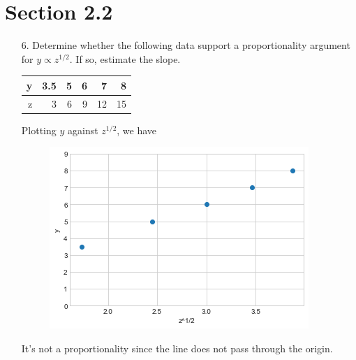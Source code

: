 \documentclass[10pt]{report}
\begin{document}
\section*{Section 2.2}
\begin{enumerate}
	\item [6.]
	Determine whether the following data support a proportionality argument for $y\propto z^{1/2}$. If so, estimate the slope.
	\begin{table}[H]
		\centering
		\begin{tabular}{*{6}{N}} 
			\toprule
			y & 3.5 & 5 & 6 & 7 & 8 \\ \midrule
			z & 3 & 6 & 9 & 12 & 15 \\
			\bottomrule
		\end{tabular}
	\end{table}
	Plotting $y$ against $z^{1/2}$, we have
	\begin{figure}[H]
		\centering
		\includegraphics[width=0.5\linewidth]{s2_2/4.png}
	\end{figure}
	It's not a proportionality since the line does not pass through the origin.
\end{enumerate}
\end{document}
